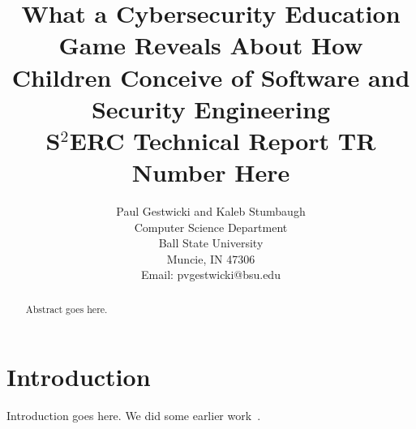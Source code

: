 \documentclass[letterpaper]{article}
\title{What a Cybersecurity Education Game Reveals About How Children Conceive of Software and Security Engineering\\
\medskip
S$^2$ERC Technical Report \textbf{TR Number Here}\\
}
\author{Paul Gestwicki and Kaleb Stumbaugh\\
Computer Science Department\\
Ball State University\\
Muncie, IN 47306\\
Email: pvgestwicki@bsu.edu}
\begin{document}
\maketitle


\begin{abstract}
  Abstract goes here.
\end{abstract}

\section{Introduction}

Introduction goes here. We did some earlier work~\citep{Gestwicki2015}.



\end{document}
